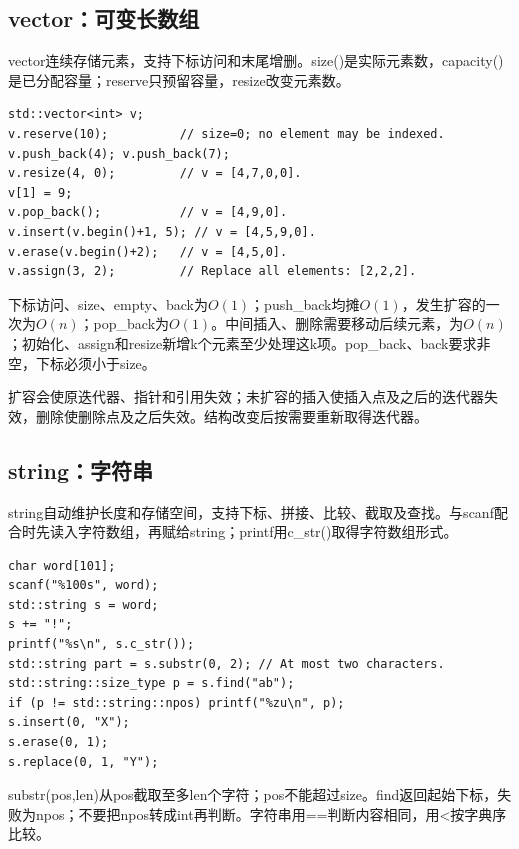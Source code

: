 \documentclass[UTF8,11pt,a4paper,fontset=none]{ctexart}
\begin{document}
\subsection{vector：可变长数组}
vector连续存储元素，支持下标访问和末尾增删。size()是实际元素数，capacity()是已分配容量；reserve只预留容量，resize改变元素数。
\par\noindent\begin{minipage}{\linewidth}
\begin{lstlisting}
std::vector<int> v;
v.reserve(10);          // size=0; no element may be indexed.
v.push_back(4); v.push_back(7);
v.resize(4, 0);         // v = [4,7,0,0].
v[1] = 9;
v.pop_back();           // v = [4,9,0].
v.insert(v.begin()+1, 5); // v = [4,5,9,0].
v.erase(v.begin()+2);   // v = [4,5,0].
v.assign(3, 2);         // Replace all elements: [2,2,2].
\end{lstlisting}
\end{minipage}\par
下标访问、size、empty、back为$O(1)$；push\_back均摊$O(1)$，发生扩容的一次为$O(n)$；pop\_back为$O(1)$。中间插入、删除需要移动后续元素，为$O(n)$；初始化、assign和resize新增k个元素至少处理这k项。pop\_back、back要求非空，下标必须小于size。

扩容会使原迭代器、指针和引用失效；未扩容的插入使插入点及之后的迭代器失效，删除使删除点及之后失效。结构改变后按需要重新取得迭代器。

\subsection{string：字符串}
string自动维护长度和存储空间，支持下标、拼接、比较、截取及查找。与scanf配合时先读入字符数组，再赋给string；printf用c\_str()取得字符数组形式。
\par\noindent\begin{minipage}{\linewidth}
\begin{lstlisting}
char word[101];
scanf("%100s", word);
std::string s = word;
s += "!";
printf("%s\n", s.c_str());
std::string part = s.substr(0, 2); // At most two characters.
std::string::size_type p = s.find("ab");
if (p != std::string::npos) printf("%zu\n", p);
s.insert(0, "X");
s.erase(0, 1);
s.replace(0, 1, "Y");
\end{lstlisting}
\end{minipage}\par
substr(pos,len)从pos截取至多len个字符；pos不能超过size。find返回起始下标，失败为npos；不要把npos转成int再判断。字符串用==判断内容相同，用<按字典序比较。
\end{document}
